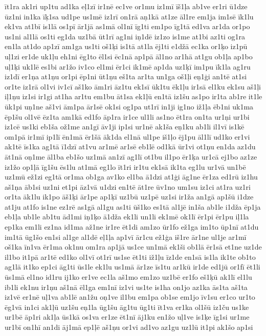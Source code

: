 {īt1ra
ak1ri
up1tu
ad1ka
eļ1zī
ir1nē
ec1ve
or1mu
iz1mī
īš1ļa
ab1ve
er1ri
ū1dze
ūz1ni
in1ka
īķ1sa
ud1pe
us1mē
iz1rī
on1rā
aņ1kā
at1ze
āl1re
em1ja
im1sē
īk1lu
ek1va
at1bī
is1lā
os1pī
ār1jā
as1mā
ol1nī
īg1ti
em1po
īg1tā
ed1va
ar1da
or1po
us1ni
al1lā
os1ti
eg1da
uz1bā
ūt1rī
ag1ni
iņ1dē
iz1zo
is1me
at1bi
az1ti
og1ra
en1la
at1do
ap1zī
am1ga
us1ti
oš1ķi
is1tā
at1la
ēj1ti
e1džā
ec1ka
or1ķo
iz1pū
uļ1zi
er1de
uk1ļu
eh1ni
ēg1to
ēl1si
ēc1nā
ap1pā
āl1no
ar1hā
at1gu
ob1ļa
ap1bo
uļ1ķi
uk1lē
es1bi
ar1žo
iv1co
el1mi
ēr1ci
ik1mē
ap1da
uz1ķī
im1pu
īk1la
ag1ru
iz1dī
er1ņa
at1ņu
or1pi
ēp1ni
ūt1ņu
eš1ta
ar1ta
un1ga
oš1ļi
eņ1ģi
an1tē
at1si
or1te
iz1rā
ol1vi
iv1cī
aš1ko
ām1ri
āz1tu
ek1sī
ūk1tu
ēk1ļu
ir1sā
el1ku
ek1su
aš1ļi
iļ1ņu
iz1si
ir1gi
at1ha
ar1tu
em1bu
āt1sa
ek1ļū
en1tā
iz1šu
as1po
ir1ta
ab1re
it1le
ūk1pi
uņ1ne
aš1vi
ām1pa
ār1sē
ok1si
og1pa
ut1rī
in1ji
ig1no
iž1ļa
ēb1ni
uk1ma
ēp1šu
ol1vē
ēz1ta
am1kā
ed1fo
āp1ra
ir1ce
ul1li
as1no
ēt1ra
on1ta
ur1ņi
ur1bi
iz1cē
us1ki
eb1ša
ož1me
an1gī
āv1ji
ip1si
ur1nē
ak1ša
eņ1ku
ab1li
il1vī
is1kē
om1pā
ir1mī
ip1lī
ēn1mā
ēr1šā
āk1da
el1nā
ul1pe
iš1ļo
ēj1pu
āl1lī
ud1ko
er1vi
ak1tē
īs1ka
ag1tā
ī1dzī
at1vu
ar1mē
ar1sē
eb1lē
od1kā
ūr1vi
ot1ņu
en1da
az1du
āt1nā
oņ1me
āl1ba
eb1šo
uz1mā
an1zī
ag1lī
ot1bu
il1po
ēr1ķa
ur1cā
ej1bo
az1ze
iz1žo
op1ļā
īg1šu
ēs1lu
at1mā
eg1lo
īt1ri
ir1tu
ek1sā
ik1ta
eg1lu
ur1vā
un1bē
uz1mū
ež1zi
eg1tā
or1ma
ob1ga
av1ko
el1ba
ā1dzi
at1ģi
āg1ne
ēr1za
ed1rū
iz1hu
aš1ņa
āb1si
uz1ni
et1pi
āz1vā
u1dzi
en1tē
āt1re
ūv1no
um1su
iz1ci
at1ra
uz1ri
or1ta
āk1lu
ik1po
āš1ķi
ār1pe
ap1ķī
uz1bū
uz1pē
uz1si
ir1ža
an1gā
ap1šū
i1dze
at1ju
at1fo
is1ne
ez1rē
as1gā
al1gu
as1ti
ūš1ko
es1tā
al1jē
in1ša
ab1le
i1dža
ēp1ja
eb1ļa
ub1le
ab1tu
ād1mi
iņ1ķo
ā1dža
ek1li
un1li
ek1mē
ok1lī
ēr1pi
ēr1pu
iļ1la
ep1ka
em1li
ez1na
id1ma
až1ne
ir1re
ēt1di
am1zo
ūr1fo
ež1ga
im1to
ūp1nī
at1du
im1tā
ūg1šo
en1si
al1ge
al1dē
eļ1ļa
ap1vī
ār1cu
ež1ģa
iš1re
ār1ne
ul1je
ar1mī
oš1ka
īn1va
ēr1ma
ok1nu
om1ra
ap1jā
us1ce
un1mā
ek1ši
ob1lā
ēr1sā
et1ne
uz1de
il1bo
it1pā
ar1tē
ed1ko
ol1vī
ot1rī
us1se
ēt1ti
iž1ļu
īz1de
en1sā
is1la
ik1te
ob1to
ag1lā
it1ko
ep1ci
āg1ti
ūs1le
ek1lu
us1mā
ār1ze
īs1tu
ar1kū
ir1de
ed1jū
or1fī
ēt1li
ūs1mā
el1no
id1ru
ij1ko
er1ve
ec1la
aš1mo
em1zo
uz1bē
er1fo
eš1ķū
ak1lī
el1lu
ib1li
ek1nu
ir1ņu
aš1nā
ēl1ga
em1nī
iz1vi
us1te
is1ha
on1jo
az1ka
ās1ta
aš1ta
iz1vē
er1nē
uļ1va
ab1lē
an1žu
oņ1ve
il1bu
em1pa
ob1se
em1jo
īv1su
er1co
ur1to
ēg1vā
in1ci
ak1ļū
uz1šu
eņ1la
ūg1šu
āg1tu
ūg1ti
īt1va
er1ka
ol1šū
iz1ču
us1ke
ur1bē
āp1ri
ak1ļa
ūs1kā
os1va
er1ze
ēt1nī
āj1ku
en1žo
uļ1ve
is1ķe
īg1si
ur1me
ur1bī
on1hī
an1di
āj1mā
ep1ļē
aš1ņu
or1vi
ad1vo
az1gu
uz1lū
it1pi
ak1šo
ap1si
}
